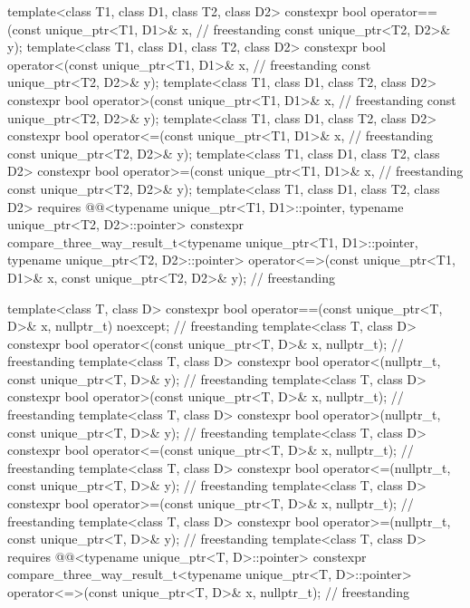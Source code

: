 \begin{codeblock}
{  template<class T1, class D1, class T2, class D2>
    constexpr bool operator==(const unique_ptr<T1, D1>& x,                          // freestanding
                              const unique_ptr<T2, D2>& y);
  template<class T1, class D1, class T2, class D2>
    constexpr bool operator<(const unique_ptr<T1, D1>& x,                           // freestanding
                             const unique_ptr<T2, D2>& y);
  template<class T1, class D1, class T2, class D2>
    constexpr bool operator>(const unique_ptr<T1, D1>& x,                           // freestanding
                             const unique_ptr<T2, D2>& y);
  template<class T1, class D1, class T2, class D2>
    constexpr bool operator<=(const unique_ptr<T1, D1>& x,                          // freestanding
                              const unique_ptr<T2, D2>& y);
  template<class T1, class D1, class T2, class D2>
    constexpr bool operator>=(const unique_ptr<T1, D1>& x,                          // freestanding
                              const unique_ptr<T2, D2>& y);
  template<class T1, class D1, class T2, class D2>
    requires @@<typename unique_ptr<T1, D1>::pointer,
                                       typename unique_ptr<T2, D2>::pointer>
    constexpr compare_three_way_result_t<typename unique_ptr<T1, D1>::pointer,
                                         typename unique_ptr<T2, D2>::pointer>
      operator<=>(const unique_ptr<T1, D1>& x, const unique_ptr<T2, D2>& y);        // freestanding

  template<class T, class D>
    constexpr bool operator==(const unique_ptr<T, D>& x, nullptr_t) noexcept;       // freestanding
  template<class T, class D>
    constexpr bool operator<(const unique_ptr<T, D>& x, nullptr_t);                 // freestanding
  template<class T, class D>
    constexpr bool operator<(nullptr_t, const unique_ptr<T, D>& y);                 // freestanding
  template<class T, class D>
    constexpr bool operator>(const unique_ptr<T, D>& x, nullptr_t);                 // freestanding
  template<class T, class D>
    constexpr bool operator>(nullptr_t, const unique_ptr<T, D>& y);                 // freestanding
  template<class T, class D>
    constexpr bool operator<=(const unique_ptr<T, D>& x, nullptr_t);                // freestanding
  template<class T, class D>
    constexpr bool operator<=(nullptr_t, const unique_ptr<T, D>& y);                // freestanding
  template<class T, class D>
    constexpr bool operator>=(const unique_ptr<T, D>& x, nullptr_t);                // freestanding
  template<class T, class D>
    constexpr bool operator>=(nullptr_t, const unique_ptr<T, D>& y);                // freestanding
  template<class T, class D>
    requires @@<typename unique_ptr<T, D>::pointer>
    constexpr compare_three_way_result_t<typename unique_ptr<T, D>::pointer>
      operator<=>(const unique_ptr<T, D>& x, nullptr_t);                            // freestanding

}
\end{codeblock}

